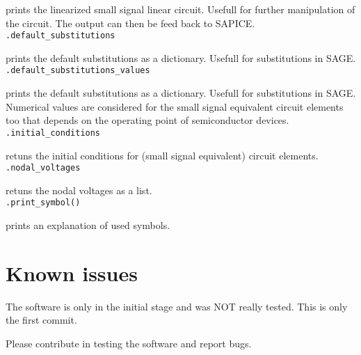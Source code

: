 \documentclass[a4paper]{article}
\begin{document}
prints the linearized small signal linear circuit. Usefull for further manipulation of the circuit. The output can then be feed back to SAPICE.\\

{\tt .default\_substitutions}

prints the default substitutions as a dictionary. Usefull for substitutions in SAGE.\\

{\tt .default\_substitutions\_values}

prints the default substitutions as a dictionary. Usefull for substitutions in SAGE. Numerical values are considered for the small signal equivalent circuit elements too that depends on the operating point of semiconductor devices.\\

{\tt .initial\_conditions}

retuns the initial conditions for (small signal equivalent) circuit elements.\\

{\tt .nodal\_voltages}

retuns the nodal voltages as a list.\\

{\tt .print\_symbol()}

prints an explanation of used symbols.

\section{Known issues}

The software is only in the initial stage and was NOT really tested. This is only the first commit.

Please contribute in testing the software and report bugs.
\end{document}
